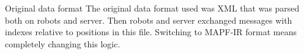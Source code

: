 \chap Original data format
The original data format used was XML that was parsed both on robots and server. Then robots and server exchanged messages with indexes relative to positions in this file. 
Switching to MAPF-IR format means completely changing this logic. 


